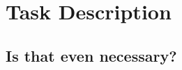 \chapter{Task Description}
\label{cha:taskdescription}

\section{Is that even necessary?}
\label{sec:isthathevennecessary?}